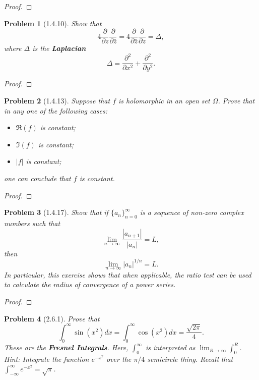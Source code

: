\documentclass[10pt]{article}
\newcommand{\sk}{\vskip 10mm}
\theoremstyle{plain}
\newtheorem{problem}{Problem}
\theoremstyle{remark}
\begin{document}
\begin{proof}
  
\end{proof}

\sk

\begin{problem}[1.4.10]
  Show that
  \[
    4\frac{\partial}{\partial z}\frac{\partial}{\partial \bar{z}}=4\frac{\partial}{\partial\bar{z}}\frac{\partial}{\partial z}=\Delta,
  \]
  where $\Delta$ is the \textbf{Laplacian}
  \[
    \Delta = \frac{\partial^2}{\partial x^2}+\frac{\partial^2}{\partial y^2}.
  \]
\end{problem}

\begin{proof}
  
\end{proof}

\sk

\begin{problem}[1.4.13]
  Suppose that $f$ is holomorphic in an open set $\Omega$. Prove that in any one
  of the following cases:
  \begin{itemize}
  \item[(a)] $\Re(f)$ is constant;
  \item[(b)] $\Im(f)$ is constant;
  \item[(c)] $|f|$ is constant;
  \end{itemize}
  one can conclude that $f$ is constant.
\end{problem}

\begin{proof}
  
\end{proof}

\sk

\begin{problem}[1.4.17]
  Show that if $\{a_n\}_{n=0}^\infty$ is a sequence of non-zero complex numbers
  such that
  \[
    \lim_{n\rightarrow\infty}\frac{|a_{n+1}|}{|a_n|}=L,
  \]
  then
  \[
    \lim_{n\rightarrow\infty}|a_n|^{1/n}=L.
  \]
  In particular, this exercise shows that when applicable, the ratio test
  can be used to calculate the radius of convergence of a power series.
\end{problem}

\begin{proof}
  
\end{proof}

\sk

\begin{problem}[2.6.1]
  Prove that
  \[
    \int_0^\infty\sin(x^2)dx=\int_0^\infty\cos(x^2)dx=\frac{\sqrt{2\pi}}{4}.
  \]
  These are the \textbf{Fresnel Integrals}. Here, $\int_0^\infty$ is
  interpreted as $\lim_{R\rightarrow\infty}\int_0^R$.\\
  Hint: Integrate the function $e^{-x^2}$ over the $\pi/4$ semicircle
  thing. Recall that $\int_{-\infty}^\infty e^{-x^2}=\sqrt{\pi}$.
\end{problem}
\end{document}
